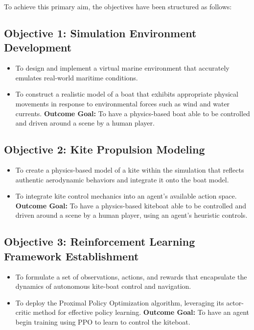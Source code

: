 To achieve this primary aim, the objectives have been structured as follows:

\subsection*{Objective 1: Simulation Environment Development}
\begin{itemize}
    \item To design and implement a virtual marine environment that accurately emulates real-world maritime conditions.
    \item To construct a realistic model of a boat that exhibits appropriate physical movements in response to environmental forces such as wind and water currents.
    \newline\textbf{Outcome Goal:} To have a physics-based boat able to be controlled and driven around a scene by a human player.
\end{itemize}

\subsection*{Objective 2: Kite Propulsion Modeling}
\begin{itemize}
    \item To create a physics-based model of a kite within the simulation that reflects authentic aerodynamic behaviors and integrate it onto the boat model.
    \item To integrate kite control mechanics into an agent’s available action space.
    \newline\textbf{Outcome Goal:} To have a physics-based kiteboat able to be controlled and driven around a scene by a human player, using an agent's heuristic controls.
\end{itemize}

\subsection*{Objective 3: Reinforcement Learning Framework Establishment}
\begin{itemize}
    \item To formulate a set of observations, actions, and rewards that encapsulate the dynamics of autonomous kite-boat control and navigation.
    \item To deploy the Proximal Policy Optimization algorithm, leveraging its actor-critic method for effective policy learning.
    \newline\textbf{Outcome Goal:} To have an agent begin training using PPO to learn to control the kiteboat.
\end{itemize}

